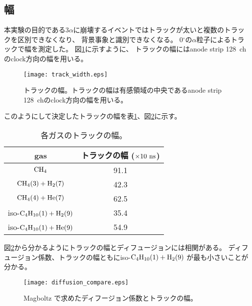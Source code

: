 \documentclass[../master]{subfiles}
\begin{document}
\subsection{幅}
本実験の目的である3$\alpha$に崩壊するイベントではトラックが太いと複数のトラックを区別できなくなり、
背景事象と識別できなくなる。
0${}^{\circ}$の$\alpha$粒子によるトラックで幅を測定した。
図\ref{fig::track_width}に示すように、
トラックの幅にはanode strip 128~chのclock方向の幅を用いる。
\begin{figure}
  \centering
  \texttt{[image: track\_width.eps]}
  \caption{トラックの幅。トラックの幅は有感領域の中央であるanode strip 128~chのclock方向の幅を用いる。}
  \label{fig::track_width}
\end{figure}
このようにして決定したトラックの幅を表\ref{tab::track_width}、図\ref{fig::diffusion_compare}に示す。
\begin{table}
  \centering
  \caption{各ガスのトラックの幅。}
  \label{tab::track_width}
  \begin{tabular}{cc}
    \toprule
    gas & トラックの幅 ($\times 10~{\rm ns}$)\\
    \midrule
    ${\rm CH_{4}}$                          & 91.1 \\
    ${\rm CH_{4} (3) + H_{2} (7)}$          & 42.3 \\
    ${\rm CH_{4} (4) + He (7)}$             & 62.5 \\
    iso-${\rm C_{4}H_{10} (1) + H_{2} (9)}$ & 35.4 \\
    iso-${\rm C_{4}H_{10} (1) + He (9)}$    & 54.9 \\
    \bottomrule
  \end{tabular}
\end{table}
図\ref{fig::diffusion_compare}から分かるようにトラックの幅とディフュージョンには相関がある。
ディフュージョン係数、トラックの幅ともにiso-$\rm C_{4}H_{10} (1) + H_{2} (9)$ が最も小さいことが分かる。
\begin{figure}
  \centering
  \texttt{[image: diffusion\_compare.eps]}
  \caption{Magboltz で求めたディフージョン係数とトラックの幅。}
  \label{fig::diffusion_compare}
\end{figure}
\end{document}

